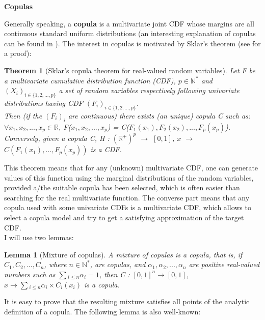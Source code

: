 \documentclass{report}
\newtheorem{lemma}{Lemma}[section]
\newtheorem{theorem}{Theorem}[section]
\begin{document}
\bigskip
\noindent \textbf{Copulas}
\bigskip

Generally speaking, a \textbf{copula}\cite{sklar1959fonctions} is a multivariate joint CDF whose margins are all continuous standard uniform distributions (an interesting explanation of copulas can be found in \cite{modellingcopulas}). The interest in copulas is motivated by Sklar's theorem\cite{sklar1959fonctions} (see \cite{carley2002new} for a proof):

\begin{theorem}[Sklar's copula theorem for real-valued random variables]\label{sklartheorem}{Let F be a multivariate cumulative distribution function (CDF), $p \in \mathbb{N}^*$ and $(X_i)_{i \in \{1, 2, ..., p\}}$ a set of random variables respectively following univariate distributions having CDF $(F_i)_{i \in \{1, 2, ..., p\}}$.\\

Then (if the $(F_i)_i$ are continuous) there exists (an unique) copula C such as: $\forall x_1, x_2, ..., x_p \in \mathbb{R}$, F($x_1, x_2, ..., x_p$) = C($F_1(x_1), F_2(x_2), ..., F_p(x_p)$).\\

Conversely, given a copula C, H : $(\mathbb{R}^+)^p$ $\rightarrow$ $[0,1]$, $x$ $\rightarrow$ $C(F_1(x_1), ..., F_p(x_p))$ is a CDF.}\end{theorem}

This theorem means that for any (unknown) multivariate CDF, one can generate values of this function using the marginal distributions of the random variables, provided a/the suitable copula has been selected, which is often easier than searching for the real multivariate function. The converse part means that any copula used with some univariate CDFs is a multivariate CDF, which allows to select a copula model and try to get a satisfying approximation of the target CDF.\\

I will use two lemmas:

\begin{lemma}[Mixture of copulas]\label{mixtureofcopulas}{A mixture of copulas is a copula, that is, if $C_1, C_2, ..., C_n$, where $n \in \mathbb{N}^*$, are copulas, and $\alpha_1, \alpha_2, ..., \alpha_n$ are positive real-valued numbers such as $\sum{_{i \leq n}}{\alpha_i} = 1$, then C : $[0,1]^n \rightarrow [0,1]$, $x \rightarrow \sum{_{i \leq n}}{\alpha_i \times C_i(x_i)}$ is a copula.}\end{lemma}

It is easy to prove that the resulting mixture satisfies all points of the analytic definition of a copula\cite{nelsen1999introduction}. The following lemma is also well-known:
\end{document}
